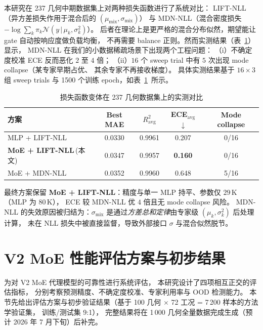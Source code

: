 本研究在 237 几何中期数据集上对两种损失函数进行了系统对比：
LIFT-NLL（异方差损失作用于混合后的 $(\mu_{\text{mix}}, \sigma_{\text{mix}})$）
与 MDN-NLL（混合密度损失 $-\log \sum_k \pi_k \mathcal{N}(y\,|\,\mu_k, \sigma^2_k)$）。
后者在理论上是更严格的混合分布似然，期望能让 gate 自动按响应度做负载均衡，
不再需要 balance 正则。然而实测结果（表~\ref{tab:lift_vs_mdn}）显示，
MDN-NLL 在我们的小数据稀疏场景下出现两个工程问题：
（i）不确定度校准 ECE 反而恶化 $2$ 至 $4$ 倍；
（ii）$16$ 个 sweep trial 中有 $5$ 次出现 mode collapse（某专家早期占优、
其余专家不再接收梯度）。
具体实测结果基于 $16\times3$ 组 sweep trials 与 1500 个训练 epoch，如表~\ref{tab:lift_vs_mdn}~所示。

\begin{table}[htbp]
\centering
\caption{损失函数变体在 237 几何数据集上的实测对比}
\label{tab:lift_vs_mdn}
\begin{tabular}{lcccc}
\toprule
\textbf{方案} & \textbf{Best MAE} & \textbf{$R^2_\text{avg}$} & \textbf{ECE$_\text{avg}$ $\downarrow$} & \textbf{Mode collapse} \\
\midrule
MLP + LIFT-NLL                    & 0.0330 & 0.9961 & 0.207 & 0/16 \\
\textbf{MoE + LIFT-NLL}\,(本文)    & 0.0347 & 0.9957 & \textbf{0.160} & 0/16 \\
MoE + MDN-NLL                     & 0.0352 & 0.9960 & 0.648 & 5/16 \\
\bottomrule
\end{tabular}
\end{table}

最终方案保留 \textbf{MoE + LIFT-NLL}：精度与单一 MLP 持平、参数仅 $29$\,K（MLP 为 $80$\,K），
ECE 较 MDN-NLL 优 $4$ 倍且无 mode collapse 风险。
MDN-NLL 的失效原因被归结为：$\sigma_{\text{mix}}$ 是通过\emph{方差总和定律}由专家级 $(\mu_k, \sigma^2_k)$ 后处理计算，
未在 NLL 损失中被直接监督，导致外部接口 $\sigma$ 与混合似然脱节。

\section{V2 MoE 性能评估方案与初步结果}
\label{sec:moe_eval}

为对 V2 MoE 代理模型的可靠性进行系统评估，
本研究设计了四项相互正交的评估指标，
分别考察预测精度、不确定度校准、专家利用率与 OOD 检测能力。
本节先给出评估方案与初步验证结果（基于 100 几何 $\times$ 72 工况 = 7\,200 样本的方法学验证集，
训练/测试集 9:1），
完整结果将在 1\,000 几何全量数据完成生成（预计 2026 年 7 月下旬）后补完。

